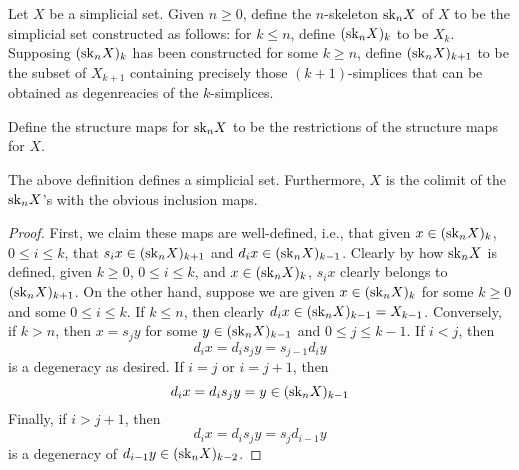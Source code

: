 \documentclass[../main.tex]{subfiles}
\begin{document}
\begin{definition}
  Let $X$ be a simplicial set. Given $n\geq0$, define the $n$-skeleton $\mathrm{sk}_nX$ of $X$ to be the simplicial set constructed as follows: for $k\leq n$, define $(\mathrm{sk}_nX)_k$ to be $X_k$. Supposing $(\mathrm{sk}_nX)_k$ has been constructed for some $k\geq n$, define $(\mathrm{sk}_nX)_{k+1}$ to be the subset of $X_{k+1}$ containing precisely those $(k+1)$-simplices that can be obtained as degenreacies of the $k$-simplices.

  Define the structure maps for $\mathrm{sk}_nX$ to be the restrictions of the structure maps for $X$.
\end{definition}

\begin{proposition}
  The above definition defines a simplicial set. Furthermore, $X$ is the colimit of the $\mathrm{sk}_nX$'s with the obvious inclusion maps.
\end{proposition}
\begin{proof}
  First, we claim these maps are well-defined, i.e., that given $x\in(\mathrm{sk}_nX)_k$, $0\leq i\leq k$, that $s_ix\in(\mathrm{sk}_nX)_{k+1}$ and $d_ix\in(\mathrm{sk}_nX)_{k-1}$. Clearly by how $\mathrm{sk}_nX$ is defined, given $k\geq0$, $0\leq i\leq k$, and $x\in(\mathrm{sk}_nX)_k$, $s_ix$ clearly belongs to $(\mathrm{sk}_nX)_{k+1}$. On the other hand, suppose we are given $x\in(\mathrm{sk}_nX)_k$ for some $k\geq0$ and some $0\leq i\leq k$. If $k\leq n$, then clearly $d_ix\in(\mathrm{sk}_nX)_{k-1}=X_{k-1}$. Conversely, if $k>n$, then $x=s_jy$ for some $y\in(\mathrm{sk}_nX)_{k-1}$ and $0\leq j\leq k-1$. If $i<j$, then
  \[d_ix=d_is_jy=s_{j-1}d_iy\]
  is a degeneracy as desired. If $i=j$ or $i=j+1$, then 
  \[d_ix=d_is_jy=y\in(\mathrm{sk}_nX)_{k-1}\]
  Finally, if $i>j+1$, then
  \[d_ix=d_is_jy=s_jd_{i-1}y\]
  is a degeneracy of $d_{i-1}y\in(\mathrm{sk}_nX)_{k-2}$.
\end{proof}
\end{document}
